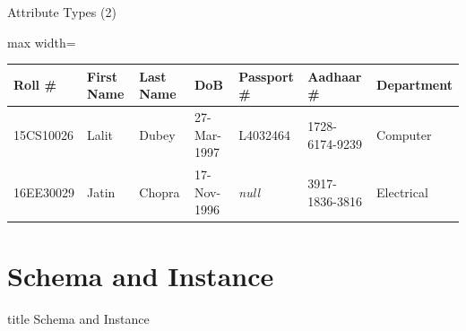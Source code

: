 \documentclass[aspectratio=169, xcolor=dvipsnames]{beamer}
\begin{document}
\begin{frame}{Attribute Types (2)}
    \begin{center}
        \begin{adjustbox}{max width=\textwidth}
        \begin{tabular}{|l|l|l|l|l|l|l|}
        \hline
        \textbf{Roll \#} & \textbf{First Name} & \textbf{Last Name} & \textbf{DoB} & \textbf{Passport \#} & \textbf{Aadhaar \#} & \textbf{Department} \\ \hline
        15CS10026 & Lalit & Dubey & 27-Mar-1997 & L4032464 & 1728-6174-9239 & Computer \\ \hline
        16EE30029 & Jatin & Chopra & 17-Nov-1996 & \textit{null} & 3917-1836-3816 & Electrical \\ \hline
        \end{tabular}
        \end{adjustbox}
    \end{center}
\end{frame}

\section{Schema and Instance}

\begin{frame}
  \vfill
  \centering
  \begin{beamercolorbox}[sep=8pt,center,shadow=true,rounded=true]{title}
    Schema and Instance\par%
  \end{beamercolorbox}
  \vfill
\end{frame}
\end{document}
